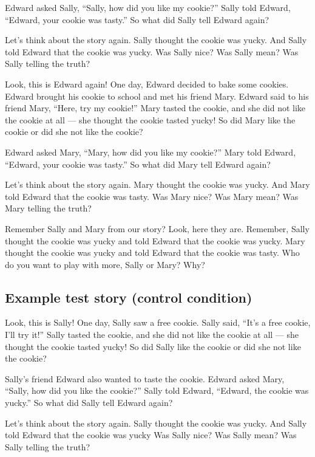 \documentclass[oneside]{report}
\begin{document}
Edward asked Sally, ``Sally, how did you like my cookie?'' Sally told
Edward, ``Edward, your cookie was tasty.'' So what did Sally tell Edward
again?

Let's think about the story again. Sally thought the cookie was yucky.
And Sally told Edward that the cookie was yucky. Was Sally nice? Was
Sally mean? Was Sally telling the truth?

Look, this is Edward again! One day, Edward decided to bake some
cookies. Edward brought his cookie to school and met his friend Mary.
Edward said to his friend Mary, ``Here, try my cookie!'' Mary tasted the
cookie, and she did not like the cookie at all --- she thought the
cookie tasted yucky! So did Mary like the cookie or did she not like the
cookie?

Edward asked Mary, ``Mary, how did you like my cookie?'' Mary told
Edward, ``Edward, your cookie was tasty.'' So what did Mary tell Edward
again?

Let's think about the story again. Mary thought the cookie was yucky.
And Mary told Edward that the cookie was tasty. Was Mary nice? Was Mary
mean? Was Mary telling the truth?

Remember Sally and Mary from our story? Look, here they are. Remember,
Sally thought the cookie was yucky and told Edward that the cookie was
yucky. Mary thought the cookie was yucky and told Edward that the cookie
was tasty. Who do you want to play with more, Sally or Mary? Why?

\subsection{Example test story (control
condition)}\label{example-test-story-control-condition}

Look, this is Sally! One day, Sally saw a free cookie. Sally said,
``It's a free cookie, I'll try it!'' Sally tasted the cookie, and she
did not like the cookie at all --- she thought the cookie tasted yucky!
So did Sally like the cookie or did she not like the cookie?

Sally's friend Edward also wanted to taste the cookie. Edward asked
Mary, ``Sally, how did you like the cookie?'' Sally told Edward,
``Edward, the cookie was yucky.'' So what did Sally tell Edward again?

Let's think about the story again. Sally thought the cookie was yucky.
And Sally told Edward that the cookie was yucky Was Sally nice? Was
Sally mean? Was Sally telling the truth?
\end{document}
